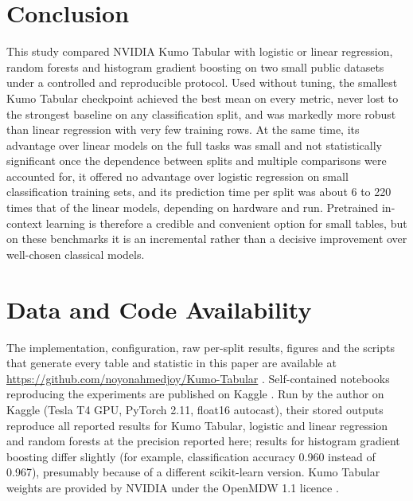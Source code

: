 \documentclass{ieeeaccess}
\begin{document}
\section{Conclusion}

This study compared NVIDIA Kumo Tabular with logistic or linear regression, random forests and histogram gradient boosting on two small public datasets under a controlled and reproducible protocol. Used without tuning, the smallest Kumo Tabular checkpoint achieved the best mean on every metric, never lost to the strongest baseline on any classification split, and was markedly more robust than linear regression with very few training rows. At the same time, its advantage over linear models on the full tasks was small and not statistically significant once the dependence between splits and multiple comparisons were accounted for, it offered no advantage over logistic regression on small classification training sets, and its prediction time per split was about 6 to 220 times that of the linear models, depending on hardware and run. Pretrained in-context learning is therefore a credible and convenient option for small tables, but on these benchmarks it is an incremental rather than a decisive improvement over well-chosen classical models.

\section*{Data and Code Availability}
The implementation, configuration, raw per-split results, figures and the scripts that generate every table and statistic in this paper are available at \url{https://github.com/noyonahmedjoy/Kumo-Tabular} \cite{project_repo}. Self-contained notebooks reproducing the experiments are published on Kaggle \cite{project_kaggle}. Run by the author on Kaggle (Tesla T4 GPU, PyTorch 2.11, float16 autocast), their stored outputs reproduce all reported results for Kumo Tabular, logistic and linear regression and random forests at the precision reported here; results for histogram gradient boosting differ slightly (for example, classification accuracy 0.960 instead of 0.967), presumably because of a different scikit-learn version. Kumo Tabular weights are provided by NVIDIA under the OpenMDW 1.1 licence \cite{nvidia_kumo_card}.
\end{document}

